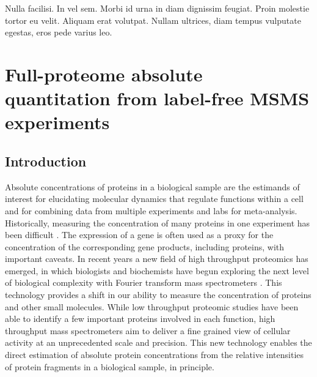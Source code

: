 
\begin{savequote}[75mm] 
Nulla facilisi. In vel sem. Morbi id urna in diam dignissim feugiat. Proin molestie tortor eu velit. Aliquam erat volutpat. Nullam ultrices, diam tempus vulputate egestas, eros pede varius leo.
\end{savequote}

\chapter{Full-proteome absolute quantitation from label-free MSMS experiments}
\label{ch:proteomics}

\section{Introduction}
\label{proteomics:sec:intro}

Absolute concentrations of proteins in a biological sample are the estimands of interest for elucidating molecular dynamics that regulate functions within a cell \citep{Ishihama:2005ir} and for combining data from multiple experiments and labs for meta-analysis.
Historically, measuring the concentration of many proteins in one experiment has been difficult \citep{Ghaemmagham:2003tu}. 
The expression of a gene is often used as a proxy for the concentration of the corresponding gene products, including proteins, with important caveats.
In recent years a new field of high throughput proteomics has emerged, in which biologists and biochemists have begun exploring the next level of biological complexity with Fourier transform mass spectrometers  \citep{Scigelova:2006p10560,Scigelova:2011dt}.
This technology provides a shift in our ability to measure the concentration of proteins and other small molecules.
 While low throughput proteomic studies have been able to identify a few important proteins involved in  each function, high throughput mass spectrometers aim to deliver a fine grained view of cellular activity at an unprecedented scale and precision.
%
This new technology enables the direct estimation of absolute protein concentrations from the relative intensities of protein fragments in a biological sample, in principle.

